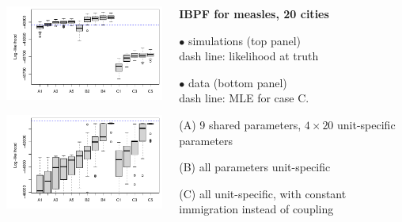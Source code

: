 \documentclass{beamer}
\begin{document}
\begin{frame}

\begin{columns}[T] %
\hspace{-4mm}\begin{column}{.75\textwidth}
  \includegraphics[width=7.5cm]{ibpf/sim_search_boxplot-1.pdf}

    \includegraphics[width=7.5cm]{ibpf/data_search_boxplot-1.pdf}

  \end{column}

\hspace{-18mm}
\begin{column}{.4\textwidth}
  \vspace{5mm}
  
  {\bf IBPF for measles, 20 cities}\\

  \vspace{1mm}
  
  $\bullet$ simulations (top panel)\\
  dash line: likelihood at truth

  \vspace{2mm}
  
  $\bullet$ data (bottom panel)\\
  dash line: MLE for case C.

    \vspace{5mm}


    
    (A) 9 shared parameters, $4\times 20$ unit-specific parameters

    \vspace{5mm}

    (B) all parameters unit-specific

    \vspace{5mm}

    (C) all unit-specific, with constant immigration instead of coupling
    
  \end{column}
\end{columns}

\end{frame}
\end{document}
